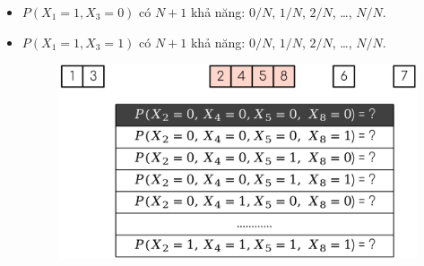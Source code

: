 \documentclass{book}
\begin{document}
\begin{itemize}
\begin{enumerate}
\begin{itemize}
                        \item $P(X_1=1, X_3=0)$ có $N+1$ khả năng: $0/N$, $1/N$, $2/N$, …, $N/N$.
                        \item $P(X_1=1, X_3=1)$ có $N+1$ khả năng: $0/N$, $1/N$, $2/N$, …, $N/N$.
                        \begin{figure}[H]
                            \centering
                            \includegraphics[width=0.7\linewidth]{images/m_ex4.png}
                            \label{fig:m_ex4}
                        \end{figure}
                    \end{itemize}
                \end{enumerate}
            \end{itemize}
            
\end{document}
